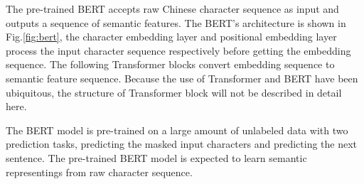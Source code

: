 \documentclass[a4paper]{article}
\begin{document}
The pre-trained BERT accepts raw Chinese character sequence as input and outputs a sequence of semantic features. The BERT's architecture is shown in Fig.\ref{fig:bert}, the character embedding layer and positional embedding layer process the input character sequence respectively before getting the embedding sequence. The following Transformer blocks convert embedding sequence to semantic feature sequence. Because the use of Transformer \cite{vaswani2017attention} and BERT have been ubiquitous, the structure of Transformer block will not be described in detail here.

The BERT model is pre-trained on a large amount of unlabeled data with two prediction tasks, predicting the masked input characters and predicting the next sentence. The pre-trained BERT model is expected to learn semantic representings from raw character sequence.
\end{document}
